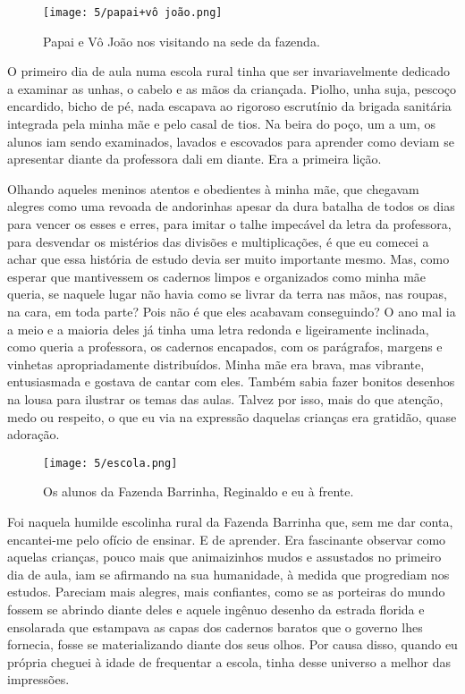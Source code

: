\begin{figure}[H]
\centering
\texttt{[image: 5/papai+vô joão.png]}
\caption{Papai e Vô João nos visitando na sede da fazenda.}
\end{figure}

O primeiro dia de aula numa escola rural tinha que ser invariavelmente dedicado a examinar as unhas, o cabelo e as mãos da criançada.
Piolho, unha suja, pescoço encardido, bicho de pé, nada escapava ao rigoroso escrutínio da brigada sanitária integrada pela minha mãe e pelo casal de tios. 
Na beira do poço, um a um, os alunos iam sendo examinados, lavados e escovados para aprender como deviam se apresentar diante da professora dali em diante. 
Era a primeira lição.

Olhando aqueles meninos atentos e obedientes à minha mãe, que chegavam alegres como uma revoada de andorinhas apesar da dura batalha de todos os dias para vencer os esses e erres, para imitar o talhe impecável da letra da professora, para desvendar os mistérios das divisões e multiplicações, é que eu comecei a achar que essa história de estudo devia ser muito importante mesmo. 
Mas, como esperar que mantivessem os cadernos limpos e organizados como minha mãe queria, se naquele lugar não havia como se livrar da terra nas mãos, nas roupas, na cara, em toda parte? 
Pois não é que eles acabavam conseguindo?  
O ano mal ia a meio e a maioria deles já tinha uma letra redonda e ligeiramente inclinada, como queria a professora, os cadernos encapados, com os parágrafos, margens e vinhetas apropriadamente distribuídos. 
Minha mãe era brava, mas vibrante, entusiasmada e gostava de cantar com eles. 
Também sabia fazer bonitos desenhos na lousa para ilustrar os temas das aulas. Talvez por isso, mais do que atenção, medo ou respeito, o que eu via na expressão daquelas crianças era gratidão, quase adoração.

\begin{figure}[H]
\centering
\texttt{[image: 5/escola.png]}
\caption{Os alunos da Fazenda Barrinha, Reginaldo e eu à frente.}
\end{figure}

Foi naquela humilde escolinha rural da Fazenda Barrinha que, sem me dar conta, encantei-me pelo ofício de ensinar.  
E de aprender. 
Era fascinante observar como aquelas crianças, pouco mais que animaizinhos mudos e assustados no primeiro dia de aula, iam se afirmando na sua humanidade, à medida que progrediam nos estudos. 
Pareciam mais alegres, mais confiantes, como se as porteiras do mundo fossem se abrindo diante deles e aquele ingênuo desenho da estrada florida e ensolarada que estampava as capas dos cadernos baratos que o governo lhes fornecia, fosse se materializando diante dos seus olhos.  
Por causa disso, quando eu própria cheguei à idade de frequentar a escola, tinha desse universo a melhor das impressões.
    
